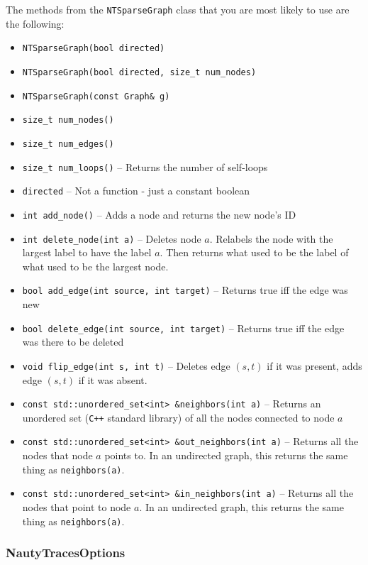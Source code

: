 \documentclass{article}
\begin{document}
The methods from the \verb|NTSparseGraph| class that you are most likely to use are the following:

\begin{itemize}
    \setlength\itemsep{-0.1em}
    \item \verb|NTSparseGraph(bool directed)|
    \item \verb|NTSparseGraph(bool directed, size_t num_nodes)|
    \item \verb|NTSparseGraph(const Graph& g)|
    \item \verb|size_t num_nodes()|
    \item \verb|size_t num_edges()|
    \item \verb|size_t num_loops()| -- Returns the number of self-loops
    \item \verb|directed| -- Not a function - just a constant boolean
    \item \verb|int add_node()| -- Adds a node and returns the new node's ID
    \item \verb|int delete_node(int a)| -- Deletes node $a$. Relabels the node with the largest label to have the label $a$. Then returns what used to be the label of what used to be the largest node.
    \item \verb|bool add_edge(int source, int target)| -- Returns true iff the edge was new
    \item \verb|bool delete_edge(int source, int target)| -- Returns true iff the edge was there to be deleted
    \item \verb|void flip_edge(int s, int t)| -- Deletes edge $(s, t)$ if it was present, adds edge $(s, t)$ if it was absent.
    \item \verb|const std::unordered_set<int> &neighbors(int a)| -- Returns an unordered set (\verb|C++| standard library) of all the nodes connected to node $a$
    \item \verb|const std::unordered_set<int> &out_neighbors(int a)| -- Returns all the nodes that node $a$ points to. In an undirected graph, this returns the same thing as \verb|neighbors(a)|.
    \item \verb|const std::unordered_set<int> &in_neighbors(int a)| -- Returns all the nodes that point to node $a$. In an undirected graph, this returns the same thing as \verb|neighbors(a)|.
\end{itemize}

\subsubsection{NautyTracesOptions}
\end{document}
